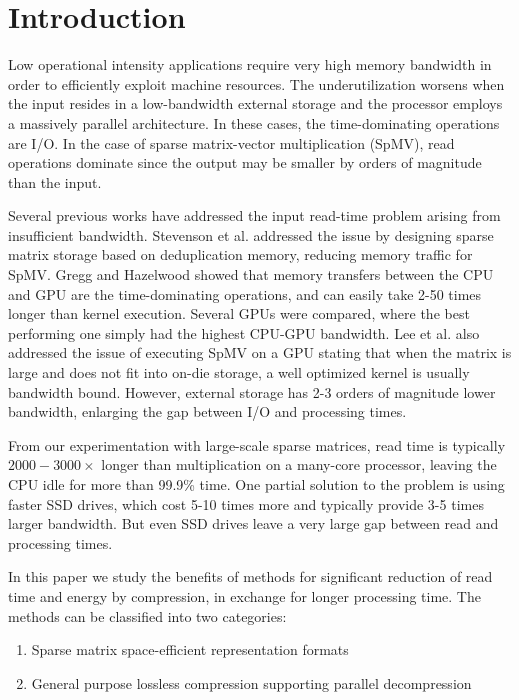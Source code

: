 \section{Introduction}
\label{sec:introduction}

Low operational intensity \cite{williams2009roofline} applications require very high memory bandwidth in order to efficiently exploit machine resources. The underutilization worsens when the input resides in a low-bandwidth external storage and the processor employs a massively parallel architecture. In these cases, the time-dominating operations are I/O. In the case of sparse matrix-vector multiplication (SpMV), read operations dominate since the output may be smaller by orders of magnitude than the input. 

Several previous works have addressed the input read-time problem arising from insufficient bandwidth. Stevenson et al. \cite{stevenson2012sparse} addressed the issue by designing sparse matrix storage based on deduplication memory, reducing memory traffic for SpMV. Gregg and Hazelwood \cite{gregg2011data} showed that memory transfers between the CPU and GPU are the time-dominating operations, and can easily take 2-50 times longer than kernel execution. Several GPUs were compared, where the best performing one simply had the highest CPU-GPU bandwidth. Lee et al. \cite{lee2010debunking} also addressed the issue of executing SpMV on a GPU stating that when the matrix is large and does not fit into on-die storage, a well optimized kernel is usually bandwidth bound. However, external storage has 2-3 orders of magnitude lower bandwidth, enlarging the gap between I/O and processing times.

From our experimentation with large-scale sparse matrices, read time is typically $2000-3000\times$ longer than multiplication on a many-core processor, leaving the CPU idle for more than 99.9\% time. One partial solution to the problem is using faster SSD drives, which cost 5-10 times more and typically provide 3-5 times larger bandwidth. But even SSD drives leave a very large gap between read and processing times.

In this paper we study the benefits of methods for significant reduction of read time and energy by compression, in exchange for longer processing time. The methods can be classified into two categories: 

\begin{enumerate}[label=(\Roman*)]
	\item Sparse matrix space-efficient representation formats
	\item General purpose lossless compression supporting parallel decompression
\end{enumerate}

